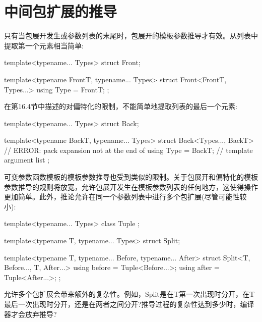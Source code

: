 \section{中间包扩展的推导}
只有当包展开发生或参数列表的末尾时，包展开的模板参数推导才有效。从列表中提取第一个元素相当简单:

\begin{cpp}
template<typename... Types>
struct Front;

template<typename FrontT, typename... Types>
struct Front<FrontT, Types...> {
	using Type = FrontT;
};
\end{cpp}

在第16.4节中描述的对偏特化的限制，不能简单地提取列表的最后一个元素:

\begin{cpp}
template<typename... Types>
struct Back;

template<typename BackT, typename... Types>
struct Back<Types..., BackT> { // ERROR: pack expansion not at the end of
	using Type = BackT; // template argument list
};
\end{cpp}

可变参数函数模板的模板参数推导也受到类似的限制。关于包展开和偏特化的模板参数推导的规则将放宽，允许包展开发生在模板参数列表的任何地方，这使得操作更加简单。此外，推论允许在同一个参数列表中进行多个包扩展(尽管可能性较小):

\begin{cpp}
template<typename... Types> class Tuple {
};

template<typename T, typename... Types>
struct Split;

template<typename T, typename... Before, typename... After>
struct Split<T, Before..., T, After...> {
	using before = Tuple<Before...>;
	using after = Tuple<After...>;
};
\end{cpp}

允许多个包扩展会带来额外的复杂性。例如，Split是在T第一次出现时分开，在T最后一次出现时分开，还是在两者之间分开?推导过程的复杂性达到多少时，编译器才会放弃推导?













































